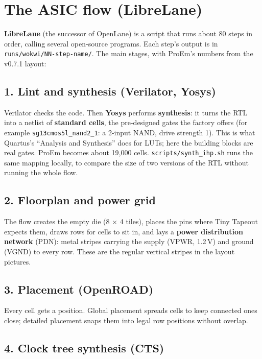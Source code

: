 \documentclass[11pt,a4paper]{article}
\newcommand{\file}[1]{\texttt{#1}}
\begin{document}
\section{The ASIC flow (LibreLane)}

\textbf{LibreLane} (the successor of OpenLane) is a script that runs about 80 steps in order, calling several open-source programs. Each step's output is in \file{runs/wokwi/NN-step-name/}. The main stages, with ProEm's numbers from the v0.7.1 layout:

\subsection{1. Lint and synthesis (Verilator, Yosys)}

Verilator checks the code. Then \textbf{Yosys} performs \textbf{synthesis}: it turns the RTL into a netlist of \textbf{standard cells}, the pre-designed gates the factory offers (for example \texttt{sg13cmos5l\_nand2\_1}: a 2-input NAND, drive strength 1). This is what Quartus's ``Analysis and Synthesis'' does for LUTs; here the building blocks are real gates. ProEm becomes about 19,000 cells. \file{scripts/synth\_ihp.sh} runs the same mapping locally, to compare the size of two versions of the RTL without running the whole flow.

\subsection{2. Floorplan and power grid}

The flow creates the empty die (8 $\times$ 4 tiles), places the pins where Tiny Tapeout expects them, draws rows for cells to sit in, and lays a \textbf{power distribution network} (PDN): metal stripes carrying the supply (VPWR, 1.2\,V) and ground (VGND) to every row. These are the regular vertical stripes in the layout pictures.

\subsection{3. Placement (OpenROAD)}

Every cell gets a position. Global placement spreads cells to keep connected ones close; detailed placement snaps them into legal row positions without overlap.

\subsection{4. Clock tree synthesis (CTS)}
\end{document}
